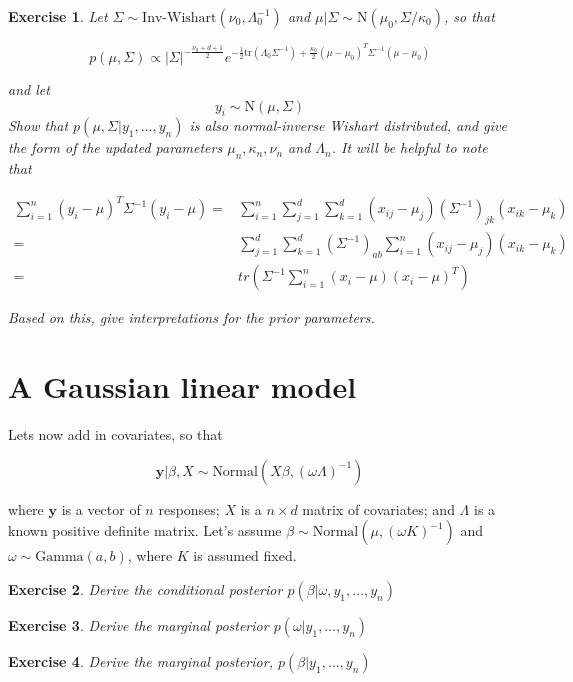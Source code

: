 \documentclass[twoside]{article}
\newcounter{lecnum}
\newtheorem{exercise}{Exercise}[lecnum]
\begin{document}
\begin{exercise}
  Let $\Sigma \sim \mbox{Inv-Wishart}(\nu_0, \Lambda_0^{-1})$ and $\mu|\Sigma \sim \mbox{N}(\mu_0, \Sigma/\kappa_0)$, so that

  $$p(\mu,\Sigma) \propto |\Sigma|^{-\frac{\nu_0+d+1}{2}}e^{-\frac{1}{2}\mbox{tr}(\Lambda_0\Sigma^{-1}) + \frac{\kappa_0}{2}(\mu-\mu_0)^T\Sigma^{-1}(\mu-\mu_0)}$$

  and let
  $$y_i \sim \mbox{N}(\mu, \Sigma)$$
  Show that $p(\mu, \Sigma|y_1,\dots,y_n)$ is also normal-inverse Wishart distributed, and give the form of the updated parameters $\mu_n, \kappa_n, \nu_n$ and $\Lambda_n$. It will be helpful to note that

  $$\begin{aligned}\sum_{i=1}^n(y_i-\mu)^T\Sigma^{-1}(y_i-\mu) =& \sum_{i=1}^n\sum_{j=1}^d\sum_{k=1}^d(x_{ij}-\mu_j)(\Sigma^{-1})_{jk}(x_{ik}-\mu_k)\\
    =& \sum_{j=1}^d\sum_{k=1}^d (\Sigma^{-1})_{ab}\sum_{i=1}^n(x_{ij}-\mu_j)(x_{ik}-\mu_k)\\
    =& tr\left(\Sigma^{-1}\sum_{i=1}^n(x_i-\mu)(x_i-\mu)^T\right)\end{aligned}$$
  
  Based on this, give interpretations for the prior parameters.
\end{exercise}
\newpage
\section{A Gaussian linear model}
Lets now add in covariates, so that

$$\mathbf{y}|\beta, X \sim \mbox{Normal}(X\beta, (\omega \Lambda)^{-1})$$

where $\mathbf{y}$ is a vector of $n$ responses; $X$ is a $n\times d$ matrix of covariates; and $\Lambda$ is a known positive definite matrix.
Let's assume $\beta\sim \mbox{Normal}(\mu, (\omega K)^{-1})$ and $\omega \sim \mbox{Gamma}(a,b)$, where $K$ is assumed fixed.


\begin{exercise}
  Derive the conditional posterior $p(\beta|\omega, y_1,\dots, y_n)$
\end{exercise}

\begin{exercise}
  Derive the marginal posterior $p(\omega|y_1,\dots, y_n)$
\end{exercise}

\begin{exercise}
  Derive the marginal posterior, $p(\beta|y_1,\dots, y_n)$
\end{exercise}
\end{document}
